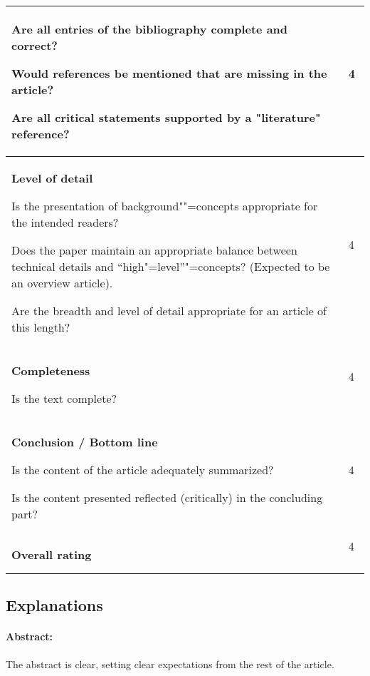 \documentclass[12pt]{scrartcl}
\begin{document}
\begin{longtable}{|p{12cm}|p{2.5cm}|}
				Are all entries of the bibliography complete and correct?
				
				Would references be mentioned that are missing in the article?
				
				Are all critical statements supported by a "literature" reference?
			& 4 \ \\				
		\hline
			\textbf{Level of detail}
			
				Is the presentation of background""=concepts appropriate for the intended readers?
				
				Does the paper maintain an appropriate balance between technical details and "`high"=level"'"=concepts? (Expected to be an overview article).
				
				Are the breadth and level of detail appropriate for an article of this length?
			& 4 \ \\				
		\hline
			\textbf{Completeness}
			
				Is the text complete?			
			& 4 \ \\	
		\hline
			\textbf{Conclusion / Bottom line}
			
				  Is the content of the article adequately summarized?
				
				Is the content presented reflected (critically) in the concluding part?			
			& 4 \ \\				
		\hline
			\textbf{Overall rating}
			& 4 \ \\				
		\hline		
		
\end{longtable}



\subsection*{Explanations}



\paragraph{Abstract:} The abstract is clear, setting clear expectations from the rest of the article.


\end{document}
